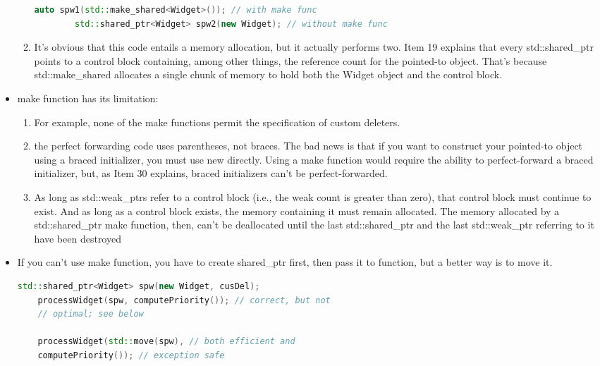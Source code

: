 \documentclass[a4paper,12pt,twoside]{book}
\begin{document}
\begin{itemize}
\begin{enumerate}
\begin{lstlisting}[frame=single, language=c++, mathescape=true]
		auto spw1(std::make_shared<Widget>()); // with make func
		std::shared_ptr<Widget> spw2(new Widget); // without make func
		\end{lstlisting}
		
		\item It's obvious that this code entails a memory allocation, but it actually performs two. Item 19 explains that every std::shared\_ptr points to a control block containing, among other things, the reference count for the pointed-to object. That's because std::make\_shared allocates a single chunk of memory to hold both the Widget object and the control block.
		
	\end{enumerate}
	
	\item make function has its limitation:
	\begin{enumerate}
		\item For example, none of the make functions permit the specification of custom deleters.
		
		\item the perfect forwarding code uses parentheses, not braces. The bad news is that if you want to construct your pointed-to object using a braced initializer, you must use new directly. Using a make function would require the ability to perfect-forward a braced initializer, but, as Item 30 explains, braced initializers can't be perfect-forwarded.
		
		\item As long as std::weak\_ptrs refer to a control block (i.e., the weak count is greater than zero), that control block must continue to exist. And as long as a control block
		exists, the memory containing it must remain allocated. The memory allocated by a std::shared\_ptr make function, then, can't be deallocated until the last std::shared\_ptr and the last std::weak\_ptr referring to it have been destroyed
	\end{enumerate}
	
	\item If you can't use make function, you have to create shared\_ptr first, then pass it to function, but a better way is to move it.
	\begin{lstlisting}[frame=single, language=c++]
	std::shared_ptr<Widget> spw(new Widget, cusDel);
	processWidget(spw, computePriority()); // correct, but not
	// optimal; see below
	
	processWidget(std::move(spw), // both efficient and
	computePriority()); // exception safe
	\end{lstlisting}
	
\end{itemize}
\end{document}
